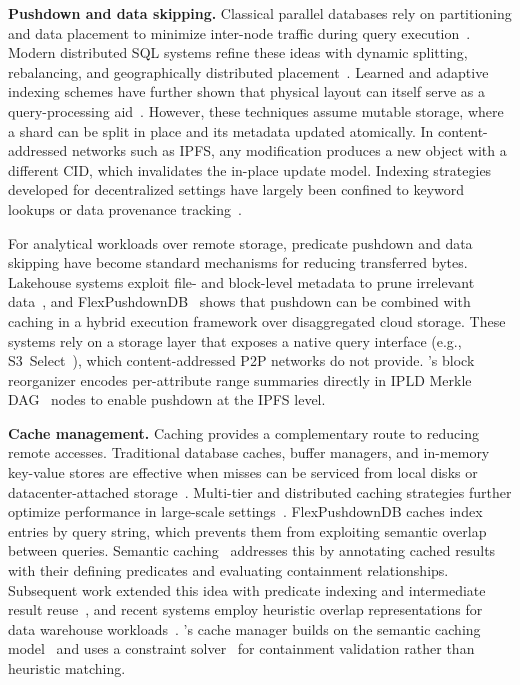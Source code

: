 \textbf{Pushdown and data skipping.}
Classical parallel databases rely on partitioning and data placement to minimize inter-node traffic during query execution~\cite{dewitt1992parallel}. Modern distributed SQL systems refine these ideas with dynamic splitting, rebalancing, and geographically distributed placement~\cite{bacon2017spanner,taft2020cockroachdb,luo2022dynahash}. Learned and adaptive indexing schemes have further shown that physical layout can itself serve as a query-processing aid~\cite{kraska2018case}. However, these techniques assume mutable storage, where a shard can be split in place and its metadata updated atomically. In content-addressed networks such as IPFS, any modification produces a new object with a different CID, which invalidates the in-place update model. Indexing strategies developed for decentralized settings have largely been confined to keyword lookups or data provenance tracking~\cite{arer2022efficient, rathee2019blockchain}.
 
For analytical workloads over remote storage, predicate pushdown and data skipping have become standard mechanisms for reducing transferred bytes. Lakehouse systems exploit file- and block-level metadata to prune irrelevant data~\cite{armbrust2021lakehouse}, and FlexPushdownDB~\cite{yang2021flexpushdowndb} shows that pushdown can be combined with caching in a hybrid execution framework over disaggregated cloud storage. These systems rely on a storage layer that exposes a native query interface (e.g., S3~Select~\cite{hunt2018s3}), which content-addressed P2P networks do not provide. \ours{}'s block reorganizer encodes per-attribute range summaries directly in IPLD Merkle DAG~\cite{ipld2023spec} nodes to enable pushdown at the IPFS level.
 
\textbf{Cache management.}
Caching provides a complementary route to reducing remote accesses. Traditional database caches, buffer managers, and in-memory key-value stores are effective when misses can be serviced from local disks or datacenter-attached storage~\cite{graefe2011modern, fitzpatrick2004distributed, redis2009, dageville2016snowflake, melnik2010dremel}. Multi-tier and distributed caching strategies further optimize performance in large-scale settings~\cite{liu2019distcache, durner2021crystal, tang2024data, zhao2013hycache, wang2022metadata}. FlexPushdownDB\cite{yang2021flexpushdowndb} caches index entries by query string, which prevents them from exploiting semantic overlap between queries. Semantic caching~\cite{dar1996semantic} addresses this by annotating cached results with their defining predicates and evaluating containment relationships. Subsequent work extended this idea with predicate indexing and intermediate result reuse~\cite{keller1996predicate, roy2000don}, and recent systems employ heuristic overlap representations for data warehouse workloads~\cite{you2025soc}. \ours{}'s cache manager builds on the semantic caching model~\cite{dar1996semantic} and uses a constraint solver~\cite{de2008z3} for containment validation rather than heuristic matching.
 
